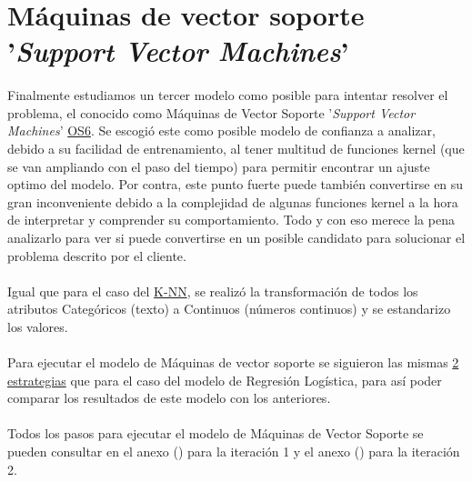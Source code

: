 \section{Máquinas de vector soporte '\textit{Support Vector Machines}'}
\label{section:svm}

\paragraph{}
Finalmente estudiamos un tercer modelo como posible para intentar resolver el problema, el conocido como Máquinas de Vector Soporte '\textit{Support Vector Machines}'\cite{ref:svm_def} \hyperref[os:OS6]{OS6}. Se escogió este como posible modelo de confianza a analizar, debido a su facilidad de entrenamiento, al tener multitud de funciones kernel\cite{ref:svm_kernels_def} (que se van ampliando\cite{ref:svm_kernels_publication} con el paso del tiempo) para permitir encontrar un ajuste optimo del modelo. Por contra, este punto fuerte puede también convertirse en su gran inconveniente debido a la complejidad de algunas funciones kernel a la hora de interpretar y comprender su comportamiento. Todo y con eso merece la pena analizarlo para ver si puede convertirse en un posible candidato para solucionar el problema descrito por el cliente.

\paragraph{}
Igual que para el caso del \hyperref[section:knn]{K-NN}, se realizó la transformación de todos los atributos Categóricos (texto) a Continuos (números continuos) y se estandarizo los valores.

\paragraph{}
Para ejecutar el modelo de Máquinas de vector soporte se siguieron las mismas \hyperref[section:lr_casos]{2 estrategias} que para el caso del modelo de Regresión Logística, para así poder comparar los resultados de este modelo con los anteriores.

\paragraph{}
Todos los pasos para ejecutar el modelo de Máquinas de Vector Soporte se pueden consultar en el anexo () para la iteración 1 y el anexo () para la iteración 2.
